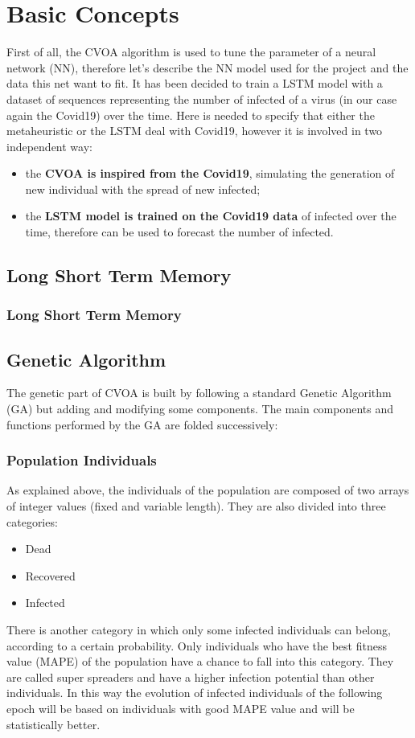 \documentclass[letterpaper]{article}%
\begin{document}
\section{Basic Concepts}
First of all, the CVOA algorithm is used to tune the parameter of a neural network (NN), therefore let's describe the NN model used for the project and the data this net want to fit.
It has been decided to train a LSTM model with a dataset of sequences representing the number of infected of a virus (in our case again the Covid19) over the time. Here is needed to specify that either the metaheuristic or the LSTM deal with Covid19, however it is involved in two independent way:
\begin{itemize}
	\item the \textbf{CVOA is inspired from the Covid19}, simulating the generation of new individual with the spread of new infected;
	\item the \textbf{LSTM model is trained on the Covid19 data} of infected over the time, therefore can be used to forecast the number of infected.
\end{itemize}


\subsection{Long Short Term Memory}
\subsubsection{Long Short Term Memory}


\subsection{Genetic Algorithm}
	The genetic part of CVOA is built by following a standard Genetic Algorithm (GA) but adding and modifying some components.
The main components and functions performed by the GA are folded successively:

\subsubsection{Population Individuals}
	As explained above, the individuals of the population are composed of two arrays of integer values (fixed and variable length). They are also divided into three categories:
\begin{itemize}
\item Dead
\item Recovered
\item Infected
\end{itemize}
There is another category in which only some infected individuals can belong, according to a certain probability. Only individuals who have the best fitness value (MAPE) of the population have a chance to fall into this category. They are called super spreaders and have a higher infection potential than other individuals. In this way the evolution of infected individuals of the following epoch will be based on individuals with good MAPE value and will be statistically better.
\end{document}
